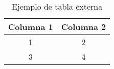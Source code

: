 \documentclass{article}
\begin{document}
\begin{table}
    \centering
    \caption{Ejemplo de tabla externa}
    \begin{tabular}{|c|c|}
        \hline
        Columna 1 & Columna 2 \\
        \hline
        1 & 2 \\
        3 & 4 \\
        \hline
    \end{tabular}
\end{table}
\end{document}
